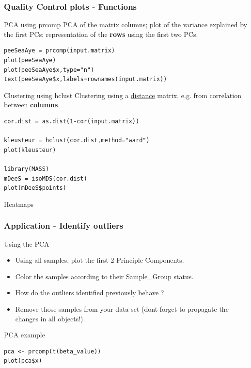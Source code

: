 \documentclass[10pt]{beamer}
\newenvironment{xframe}[2][]
  {\begin{frame}[fragile,environment=xframe,#1]
  \frametitle{#2}}
  {\end{frame}}
\begin{document}

\begin{xframe}[shrink=10]{Quality Control plots - Functions}
  \begin{block}{PCA using {\sf prcomp}}
    PCA of the matrix columns; plot of the variance explained by the first PCs; representation of the {\bf rows} using the first two PCs.
\begin{verbatim}
peeSeaAye = prcomp(input.matrix)
plot(peeSeaAye)
plot(peeSeaAye$x,type="n")
text(peeSeaAye$x,labels=rownames(input.matrix))
\end{verbatim}  
  \end{block}
  \begin{block}{Clustering using {\sf hclust}}
    Clustering using a \uline{distance} matrix, e.g. from correlation between {\bf columns}.
\begin{verbatim}
cor.dist = as.dist(1-cor(input.matrix))

kleusteur = hclust(cor.dist,method="ward")
plot(kleusteur)

library(MASS)
mDeeS = isoMDS(cor.dist)
plot(mDeeS$points)
\end{verbatim}  
  \end{block}
\end{xframe}


\begin{frame}{Heatmaps}
  
\end{frame}


\begin{xframe}{Application - Identify outliers}
  \begin{block}{Using the PCA}
    \begin{itemize}
      \item Using all samples, plot the first 2 Principle Components.
      \item Color the samples according to their Sample\_Group status. 
      \item How do the outliers identified previously behave ?
      \item Remove those samples from your data set (dont forget to propagate
      the changes in all objects!).
    \end{itemize}
  \end{block}
   \begin{exampleblock}{PCA example}
\begin{verbatim}
pca <- prcomp(t(beta_value))
plot(pca$x)
\end{verbatim}  
  \end{exampleblock}
\end{xframe}
\end{document}
